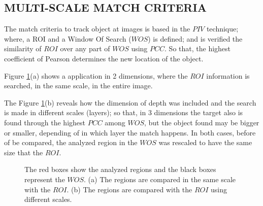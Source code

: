 
\subsection{MULTI-SCALE MATCH CRITERIA}
The match criteria to track object at images is based in the $PIV$ technique; 
where, a ROI and a Window Of Search ($WOS$) is defined; and is 
verified the similarity of $ROI$ over any part of $WOS$ using $PCC$. 
So that, the highest coefficient of Pearson determines the new location of the object.

Figure \ref{fig:multires}(a) shows a application in 2 dimensions, where
the $ROI$ information is searched, in the same scale,  in the entire image.

The Figure \ref{fig:multires}(b) reveals how the dimension of depth was included and
the search is made in different scales (layers); so that, in 3 dimensions the target 
also is found through the highest $PCC$ among $WOS$, but the object found may be 
bigger or smaller, depending of in which layer the match happens. 
In both cases, before of be compared, the analyzed region in the $WOS$ was 
rescaled to have the same size that the $ROI$.

\begin{figure}[H]
\centering
  \caption{The red boxes show the analyzed regions and the black boxes represent the $WOS$. 
  (a) The regions are compared in the same scale with the $ROI$. 
  (b) The regions are compared with the $ROI$  using different scales.}
  \label{fig:multires}
\end{figure}




